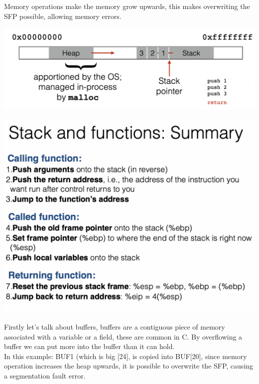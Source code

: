 \documentclass[11pt, oneside]{article}   	%
\begin{document}
Memory operations make the memory grow upwards, this makes overwriting the SFP possible, allowing memory errors.\\
\begin{center}
\includegraphics[scale = 0.5]{memory5}
\end{center}
\begin{center}
\includegraphics[scale = 0.4]{memory6}
\end{center}
Firstly let's talk about buffers, buffers are a contiguous piece of memory associated with a variable or a field, these are common in C. By overflowing a buffer we can put more into the buffer than it can hold.\\
In this example: BUF1 (which is big [24], is copied into BUF[20], since memory operation increases the heap upwards, it is possible to overwrite the SFP, causing a segmentation fault error.
\end{document}
